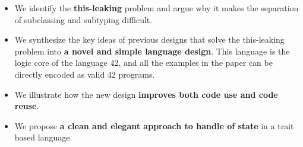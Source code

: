 



\begin{itemize}
\item We identify the {\bf this-leaking} problem and argue why it
  makes the separation of subclassing and subtyping difficult.
\item We synthesize the key ideas of previous designs that solve the
  this-leaking problem into {\bf a novel and
  simple language design}. This language is the logic core of the language 42, and 
  all the examples in the paper can be directly encoded as valid 42 programs. 

\item We illustrate how the new design {\bf improves both code use and code
  reuse}.
\item We propose {\bf a clean and elegant approach to handle of state} in a trait based language.

\end{itemize}


\saveSpace
\saveSpace

